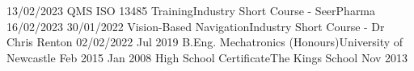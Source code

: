 %
%
%

 \begin{education}
	\school
	{13/02/2023}	{QMS ISO 13485 Training}{Industry Short Course - SeerPharma}
	{16/02/2023}
	\emptySeparator
	\school
		{30/01/2022}	{Vision-Based Navigation}{Industry Short Course - Dr Chris Renton}
		{02/02/2022}
	\emptySeparator
	\school
		{Jul 2019}	{B.Eng. Mechatronics (Honours)}{University of Newcastle}
		{Feb 2015}
	\emptySeparator
	\school
	{Jan 2008}	{High School Certificate}{The Kings School}
	{Nov 2013}
	\emptySeparator
 \end{education}